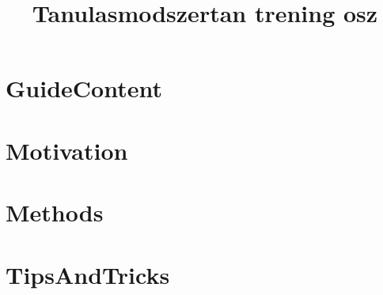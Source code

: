 \documentclass[12pt]{article}
\title{Tanulasmodszertan trening osz}
\begin{document}
\maketitle

\section{GuideContent}


\section{Motivation}


\section{Methods}


\section{TipsAndTricks}



\end{document}
